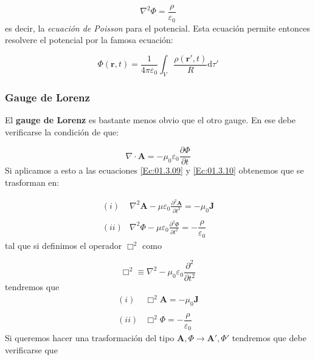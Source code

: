 \documentclass[12pt,a4paper]{article}
\newcommand{\parciales}[2]{\frac{\partial #1}{\partial #2}}
\newcommand{\D}{\mathrm{d}}
\newcommand{\dive}{\nabla \cdot}
\newcommand{\Jn}{\mathbf{J}}
\newcommand{\rn}{\mathbf{r}}
\newcommand{\An}{\mathbf{A}}
\numberwithin{equation}{section}
\numberwithin{figure}{section}
\begin{document}
\begin{equation}
\nabla^2 \Phi = \dfrac{\rho}{\varepsilon_0}
\end{equation}
es decir, la \textit{ecuación de Poisson} para el potencial. Esta ecuación permite entonces resolvere el potencial por la famosa ecuación:

\begin{equation}
\Phi (\rn,t) = \dfrac{1}{4 \pi \varepsilon_0} \int_V \dfrac{\rho(\rn',t)}{R} \D \tau'
\end{equation}

\subsubsection{Gauge de Lorenz}

El \textbf{gauge de Lorenz} es bastante menos obvio que el otro gauge. En ese debe verificarse la condición de que:

\begin{equation}
\dive \An = - \mu_0 \varepsilon_0 \parciales{\Phi}{t}
\end{equation}
Si aplicamos a esto a las ecuaciones \ref{Ec:01.3.09} y \ref{Ec:01.3.10} obtenemos que se trasforman en:

\begin{equation} \begin{array}{rl} 
(i) & \nabla^2 \An - \mu \varepsilon_0 \parciales{^2 \An}{t^2} = - \mu_0 \Jn \\ \\
(ii) & \nabla^2 \Phi - \mu \varepsilon_0 \parciales{^2 \Phi}{t^2} = - \dfrac{\rho}{\varepsilon_0} 
\end{array} \label{Ec:01.3.15}
\end{equation}
tal que si definimos el operador $\Box^2$ como 

\begin{equation}
\Box^2 \equiv \nabla^2 - \mu_0 \varepsilon_0 \parciales{^2}{t^2}
\end{equation}
tendremos que
\begin{equation} \begin{array}{rl} 
(i) & \Box^2 \An = - \mu_0 \Jn \\ \\
(ii) &  \Box^2 \Phi = - \dfrac{\rho}{\varepsilon_0} \label{Ec:01.3.17}
\end{array} 
\end{equation}
Si queremos hacer una trasformación del tipo $\An, \Phi \rightarrow \An', \Phi'$ tendremos que debe verificarse que
\end{document}
